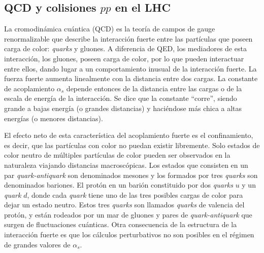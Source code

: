 \subsection{QCD y colisiones $pp$ en el LHC}

La cromodinámica cuántica (QCD) \cite{Ellis:1991qj} es la teoría de campos de gauge
renormalizable que describe la interacción fuerte entre las partículas que
poseen carga de color: \emph{quarks} y gluones. A diferencia de QED, los mediadores
de esta interacción, los gluones, poseen carga de color, por lo que
pueden interactuar entre ellos, dando lugar a un comportamiento inusual de la
interacción fuerte. La fuerza fuerte aumenta linealmente con la distancia entre
dos cargas. La constante de acoplamiento $\alpha_s$ depende entonces de
la distancia entre las cargas o de la escala de energía de la interacción. Se
dice que la constante ``corre'', siendo grande a bajas energía (o grandes
distancias) y haciéndose más chica a altas energías (o menores distancias).

El efecto neto de esta característica del acoplamiento fuerte es el
confinamiento, es decir, que las partículas con color no puedan existir
libremente. Solo estados de color neutro de múltiples partículas de color pueden
ser observados en la naturaleza viajando distancias macroscópicas. Los estados
que consisten en un par \emph{quark-antiquark} son denominados mesones y  los
 formados por tres \emph{quarks} son denominados bariones. El protón en un
barión constituido por dos \emph{quarks} $u$ y un \emph{quark} $d$, donde cada \emph{quark} tiene uno de
las tres posibles cargas de color para dejar un estado neutro. Estos tres \emph{quarks}
son llamados \emph{quarks} de valencia del protón, y están rodeados por un mar
de gluones y pares de \emph{quark-antiquark} que surgen de fluctuaciones cuánticas.
Otra consecuencia de la estructura de la interacción fuerte es que los cálculos
perturbativos no son posibles en el régimen de grandes valores de $\alpha_s$.

